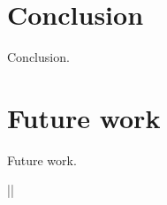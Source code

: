 \documentclass[english,version-2020-11]{uzl-thesis}
\begin{document}
\clearpage


\chapter{Conclusion}
\label{chapter-conclusion}
Conclusion.
\clearpage

\chapter{Future work}
\label{chapter-futerwork}

Future work.




%











|$$|
\end{document}
